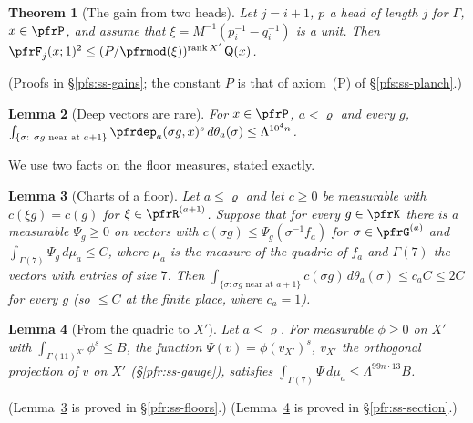 \documentclass[10pt]{amsart}
\newtheorem{theorem}{Theorem}[section]
\newtheorem{lemma}[theorem]{Lemma}
\theoremstyle{definition}
\theoremstyle{remark}
\begin{document}
\begin{theorem}[The gain from two heads]\label{pfr:gain-heads}
Let $j=i+1$, $p$ a head of length $j$ for $\Gamma$, $x\in\pfrP$, and assume that
$\xi=M^{-1}(p_i^{-1}-q_i^{-1})$ is a unit. Then
$\pfrF_j(x;1)^2\le(P/\pfrmod(\xi))^{\operatorname{rank}X'}\,\mathsf Q(x)$.
\end{theorem}
(Proofs in \S\ref{pfs:ss-gains}; the constant $P$ is that of axiom~(P) of \S\ref{pfs:ss-planch}.)

\begin{lemma}[Deep vectors are rare]\label{pfr:depth-rare}
For $x\in\pfrP$, $a<\varrho$ and every $g$,
$\int_{\{\sigma:\ \sigma g\text{ near at }a+1\}}\pfrdep_a(\sigma g,x)^s\,d\theta_a(\sigma)\le\Lambda^{10^4n}$.
\end{lemma}
We use two facts on the floor measures, stated exactly.

\begin{lemma}[Charts of a floor]\label{pfr:chart}
Let $a\le\varrho$ and let $c\ge0$ be measurable with $c(\xi g)=c(g)$ for $\xi\in\pfrR^{(a+1)}$. Suppose that for
every $g\in\pfrK$ there is a measurable $\Psi_g\ge0$ on vectors with $c(\sigma g)\le\Psi_g(\sigma^{-1}f_a)$ for
$\sigma\in\pfrG^{(a)}$ and $\int_{\Gamma(7)}\Psi_g\,d\mu_a\le C$, where $\mu_a$ is the measure of the quadric
of $f_a$ and $\Gamma(7)$ the vectors with entries of size $7$. Then
$\int_{\{\sigma:\sigma g\text{ near at }a+1\}}c(\sigma g)\,d\theta_a(\sigma)\le c_aC\le2C$ for every $g$ (so
$\le C$ at the finite place, where $c_a=1$).
\end{lemma}

\begin{lemma}[From the quadric to $X'$]\label{pfr:quadricX}
Let $a\le\varrho$. For measurable $\phi\ge0$ on $X'$ with $\int_{\Gamma(11)^{X'}}\phi^s\le B$, the function
$\Psi(v)=\phi(v_{X'})^s$, $v_{X'}$ the orthogonal projection of $v$ on $X'$ (\S\ref{pfr:ss-gauge}), satisfies
$\int_{\Gamma(7)}\Psi\,d\mu_a\le\Lambda^{99n\cdot13}B$.
\end{lemma}
(Lemma~\ref{pfr:chart} is proved in \S\ref{pfr:ss-floors}.)
(Lemma~\ref{pfr:quadricX} is proved in \S\ref{pfr:ss-section}.)
\end{document}
